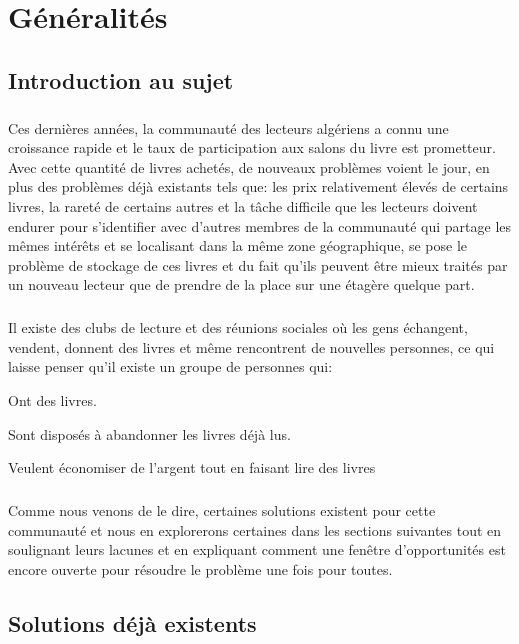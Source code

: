 

\chapter{Généralités}
\section{Introduction au sujet}
\paragraph{}
Ces dernières années, la communauté des lecteurs algériens a connu une croissance rapide et le taux de participation aux salons du livre est prometteur. Avec cette quantité de livres achetés, de nouveaux problèmes voient le jour, en plus des problèmes déjà existants tels que: les prix relativement élevés de certains livres, la rareté de certains autres et la tâche difficile que les lecteurs doivent endurer pour s'identifier avec d'autres membres de la communauté qui partage les mêmes intérêts et se localisant dans la même zone géographique, se pose le problème de stockage de ces livres et du fait qu’ils peuvent être mieux traités par un nouveau lecteur que de prendre de la place sur une étagère quelque part.
\paragraph{}
Il existe des clubs de lecture et des réunions sociales où les gens échangent, vendent, donnent des livres et même rencontrent de nouvelles personnes, ce qui laisse penser qu'il existe un groupe de personnes qui:
\begin{list}{•}{}
\item Ont des livres.
\item Sont disposés à abandonner les livres déjà lus.
\item Veulent économiser de l’argent tout en faisant lire des livres
\end{list}
\paragraph{}
Comme nous venons de le dire, certaines solutions existent pour cette communauté et nous en explorerons certaines dans les sections suivantes tout en soulignant leurs lacunes et en expliquant comment une fenêtre d'opportunités est encore ouverte pour résoudre le problème une fois pour toutes.
\newpage
\section{Solutions déjà existents}
